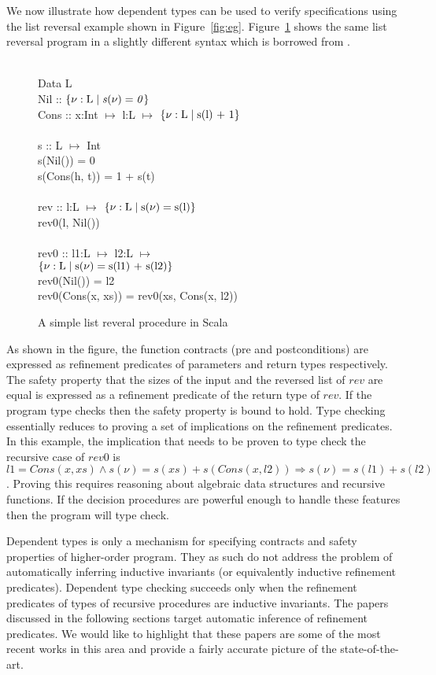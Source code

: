 We now illustrate how dependent types can be used to verify specifications using 
the list reversal example shown in Figure~\ref{fig:eg}.
Figure~\ref{fig:deptypes-eg} shows the same list reversal program 
in a slightly different syntax which is borrowed from \cite{rjhala:ESOP13}.
%
\begin{figure}
\begin{myprogram}
\\
\pnl Data L \\
\pnl \>   Nil :: $\mathit{\{ \nu:\text{L} \; | \; s(\nu) = 0\}}$  \\
\pnl \>   Cons :: x:Int $\mapsto$ l:L $\mapsto$ 
				$\mathit{\{ \nu:\text{L} \; | \; \text{s(l) + 1}\}}$ \\
\\
\pnl s :: L $\mapsto$ Int \\
\pnl \>    s(Nil()) = 0 \\
\pnl \>    s(Cons(h, t)) = 1 + s(t) \\
\\
\pnl rev :: l:L $\mapsto$ $\mathit{\{ \nu:\text{L} \; | \; \text{s}(\nu) = \text{s(l)}\}}$ \\
\pnl \> rev0(l, Nil())  \\
\\    
\pnl rev0 :: l1:L $\mapsto$ l2:L $\mapsto$  \\
\> \> \> \> \> $\mathit{\{ \nu:\text{L} \; | \; \text{s}(\nu) = \text{s(l1) + s(l2)}\}}$  \\
\pnl \> rev0(Nil()) = l2 \\
\pnl \> rev0(Cons(x, xs)) = rev0(xs, Cons(x, l2))
\end{myprogram}
\caption{A simple list reveral procedure in Scala} \label{fig:deptypes-eg}
\end{figure}
%
As shown in the figure, the function contracts (pre and postconditions) are expressed as refinement predicates of parameters and return types respectively. 
The safety property that the sizes of the input and the reversed list of $rev$ are equal is expressed as a refinement predicate of the return type of $rev$. If the 
program type checks then the safety property is bound to hold.
Type checking essentially reduces to proving a set of implications on the refinement predicates. In this example, the implication that needs to be proven to type check the recursive case of $rev0$ is $l1 = Cons(x,xs) \wedge s(\nu) = s(xs) + s(Cons(x,l2)) \Rightarrow s(\nu) = s(l1) + s(l2)$.
Proving this requires reasoning about algebraic data structures and recursive functions. If the decision procedures are powerful enough to handle these features then the program will type check.

Dependent types is only a mechanism for specifying contracts and safety properties of higher-order program. They as such do not address the problem of automatically inferring inductive invariants (or equivalently inductive refinement predicates). Dependent type checking succeeds only when the refinement predicates of types of recursive procedures are inductive invariants. The papers discussed in the following sections target automatic inference of refinement predicates. We  would like to highlight that these papers are some of the most recent works in this area and provide a fairly accurate picture of the state-of-the-art.